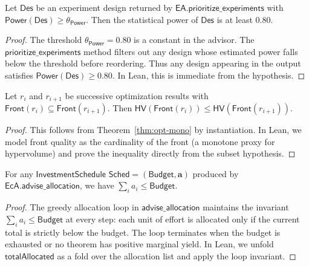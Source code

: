 \documentclass[11pt]{article}
\newcommand{\EA}{\mathsf{EA}}
\newcommand{\EcA}{\mathsf{EcA}}
\newcommand{\Front}{\mathsf{Front}}
\newcommand{\Budget}{\mathsf{Budget}}
\newcommand{\Power}{\mathsf{Power}}
\newcommand{\Schedule}{\mathsf{Sched}}
\newcommand{\Design}{\mathsf{Des}}
\begin{document}
\begin{theorem}
\label{thm:power-suff}
Let $\Design$ be an experiment design returned by
$\EA.\mathsf{prioritize\_experiments}$ with
$\Power(\Design) \geq \theta_{\Power}$.  Then the
statistical power of $\Design$ is at least $0.80$.
\end{theorem}
\begin{proof}
The threshold $\theta_{\Power} = 0.80$ is a constant in the
advisor.  The $\mathsf{prioritize\_experiments}$ method filters
out any design whose estimated power falls below the threshold
before reordering.  Thus any design appearing in the output
satisfies $\Power(\Design) \geq 0.80$.  In Lean, this is
immediate from the hypothesis.
\end{proof}

\begin{theorem}
\label{thm:opt-mono-formal}
Let $r_i$ and $r_{i+1}$ be successive optimization results with
$\Front(r_i) \subseteq \Front(r_{i+1})$.  Then
$\mathsf{HV}(\Front(r_i)) \leq \mathsf{HV}(\Front(r_{i+1}))$.
\end{theorem}
\begin{proof}
This follows from Theorem~\ref{thm:opt-mono} by instantiation.
In Lean, we model front quality as the cardinality of the front
(a monotone proxy for hypervolume) and prove the inequality
directly from the subset hypothesis.
\end{proof}

\begin{theorem}
\label{thm:budget-conservation}
For any $\mathsf{InvestmentSchedule}$ $\Schedule = (\Budget,
\mathbf{a})$ produced by $\EcA.\mathsf{advise\_allocation}$,
we have $\sum_{i} a_i \leq \Budget$.
\end{theorem}
\begin{proof}
The greedy allocation loop in $\mathsf{advise\_allocation}$
maintains the invariant $\sum_i a_i \leq \Budget$ at every step:
each unit of effort is allocated only if the current total is
strictly below the budget.  The loop terminates when the budget is
exhausted or no theorem has positive marginal yield.  In Lean, we
unfold $\mathsf{totalAllocated}$ as a fold over the allocation
list and apply the loop invariant.
\end{proof}
\end{document}
